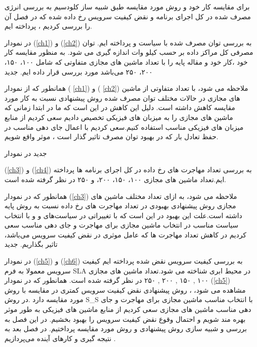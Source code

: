 برای مقایسه کار خود و روش مورد مقایسه طبق شبیه ساز کلودسیم به بررسی انرژی مصرف شده در کل اجرای برنامه و نقض کیفیت سرویس رخ داده شده که در فصل
 آن را بررسی کردیم ، پرداخته ایم.

در نمودار
(\ref{ch1})
و
(\ref{ch2})
به بررسی توان مصرف شده با سیاست
و
 پرداخته ایم. توان مصرفی کل مراکز داده بر حسب کیلو وات اندازه گیری می شود. به منظور مقایسه کار خود ،کار خود و مقاله پایه را با تعداد ماشین های مجازی متفاوتی که شامل ۱۰۰، ۱۵۰، ۲۰۰، ۲۵۰  می‌باشد مورد بررسی قرار داده ایم.
‌جدید
 
 
  همانطور که از نمودار
( \ref{ch1})
 و
( \ref{ch2})
  ملاحظه می شود، با تعداد متفاوتی از ماشین های مجازی در حالات مختلف توان مصرف شده روش پیشنهادی نسبت به کار مورد مقایسه کاهش داشته است. دلیل این کاهش در این است که ما در ابتدا زمانی که ماشین های مجازی را به میزبان های فیزیکی تخصیص دادیم سعی کردیم از منابع میزبان های فیزیکی مناسب استفاده کنیم.سعی کردیم با اعمال جای دهی مناسب در حفظ تعادل بار که در بهبود توان مصرف تاثیر گذار است  ، موثر واقع شویم.

‌جدید 
در نمودار
	
		
(\ref{ch3})
و
(\ref{ch4})
به بررسی تعداد مهاجرت های رخ داده در کل اجرای برنامه ها  پرداخته ایم.تعداد ماشین های مجازی ۱۰۰، ۱۵۰، ۲۰۰، و ۲۵۰ در نظر گرفته شده است. 

همانطور که در نمودار 
(\ref{ch3})
 ملاحظه می شود، به ازای تعداد مختلف ماشین های مجازی روش پیشنهادی بهبودی در تعداد مهاجرت های رخ داده نسبت به روش پایه داشته است.علت این بهبود در این است که با تغییراتی در سیاست‌های 
 و
 و با
  انتخاب سیاست مناسب در انتخاب ماشین مجازی برای مهاجرت و جای دهی مناسب سعی کردیم در کاهش تعداد مهاجرت ها که عامل موثری در نقض کیفیت سرویس می‌باشد، تاثیر بگذاریم.
‌جدید


 در نمودار
(\ref{ch5})
و
(\ref{ch6})
 به بررسی کیفیت سرویس نقض شده پرداخته ایم کیفیت سرویس معمولا به فرم  SLA در محیط ابری شناخته می شود.تعداد ماشین های مجازی
۱۰۰
,
۱۵۰
,
۲۰۰
,
۲۵۰
  در نظر گرفته شده است.
همانطور که در نمودار
(\ref{ch5})
مشاهده می شود، ­، روش پیشنهادی نقض کیفیت سرویس کمتری در مقایسه با روش مورد مقایسه دارد .در روش S\_S با انتخاب مناسب ماشین مجازی برای مهاجرت و جای دهی مناسب ماشین های مجازی سعی کردیم از منابع ماشین های فیزیکی به طور موثر بهره مند شویم و احتمال وقوع نقض کیفیت سرویس  را بهبود بخشیم. 
در این فصل به بررسی و شبیه سازی روش پیشنهادی  و روش مورد مقایسه پرداختیم. در فصل بعد به نتیجه گیری  و کارهای آینده می‌پردازیم .
